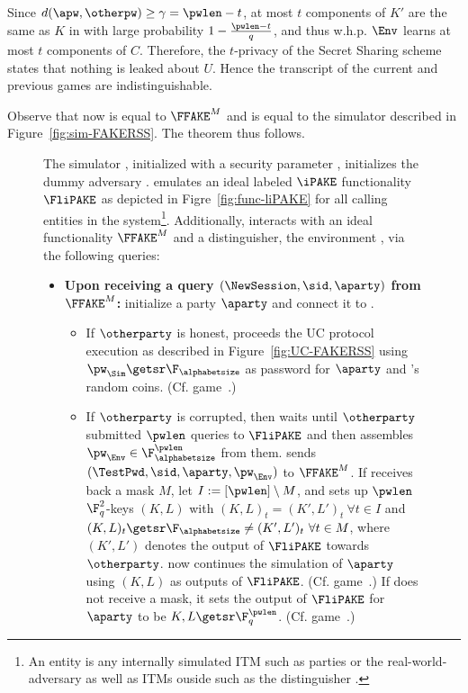 \begin{games}
Since $d(\apw,\otherpw)\geq\gamma = \pwlen-t$, at most $t$ components of $K'$ are the same as $K$ in \previousgame with large probability $1-\frac{\pwlen-t}{q}$, and thus w.h.p. $\Env$ learns at most $t$ components of $C$. Therefore, the $t$-privacy of the Secret Sharing scheme states that nothing is leaked about $U$.
Hence the transcript of the current and previous games are indistinguishable.

Observe that now \Func is equal to $\FFAKE^M$ and \Sim is equal to the simulator described in Figure~\ref{fig:sim-FAKERSS}. The theorem thus follows.
\end{games}

\begin{figure}[ht!]
  \centering
  \begin{fboxenv}
    \begin{minipage}{0.95\textwidth}
      The simulator \Sim, initialized with a security parameter \SEC, initializes the dummy adversary \AdvA. \Sim emulates an ideal labeled $\iPAKE$ functionality $\FliPAKE$ as depicted in Figre~\ref{fig:func-liPAKE} for all calling entities in the system\footnote{An entity is any internally simulated ITM such as parties or the real-world-adversary as well as ITMs ouside \Sim such as the distinguisher \Env.}. Additionally, \Sim interacts with an ideal functionality $\FFAKE^M$ and a distinguisher, the environment \Env, via the following queries:\\[-1.8em]
      \begin{itemize}
      \item
        \textbf{Upon receiving a query
        $(\NewSession,\sid,\aparty)$ from $\FFAKE^M$:}
        initialize a party $\aparty$ and connect it to \AdvA. 
        \begin{itemize}
         \item If $\otherparty$ is honest, \Sim proceeds the UC protocol execution as described in Figure~\ref{fig:UC-FAKERSS} using $\pw_{\Sim}\getsr\F_\alphabetsize$ as password for $\aparty$ and \Sim's random coins. (Cf. game~.)
         \item If $\otherparty$ is corrupted, then \Sim waits until $\otherparty$ submitted $\pwlen$ queries to $\FliPAKE$ and then assembles $\pw_\Env\in\F_\alphabetsize^\pwlen$ from them. \Sim sends $(\TestPwd,\sid,\aparty,\pw_\Env)$ to $\FFAKE^M$. If \Sim receives back a mask $M$, let $I:=[\pwlen]\setminus M$, and \Sim sets up $\pwlen$ $\F_q^2$-keys $(K,L)$ with $(K,L)_t=(K',L')_t~\forall t\in I$ and $(K,L)_t\getsr\F_\alphabetsize\neq (K',L')_t~\forall t\in M$, where $(K',L')$ denotes the output of $\FliPAKE$ towards $\otherparty$. \Sim now continues the simulation of $\aparty$ using $(K,L)$ as outputs of $\FliPAKE$. (Cf. game~.) If \Sim does not receive a mask, it sets the output of $\FliPAKE$ for $\aparty$ to be $K,L\getsr\F_q^\pwlen$. (Cf. game~.)

\end{itemize}
\end{itemize}
\end{minipage}
\end{fboxenv}
\end{figure}
